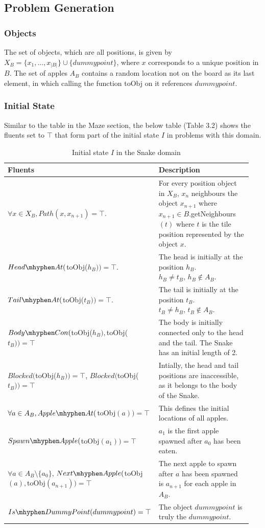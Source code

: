 \subsection{Problem Generation}
\subsubsection{Objects}
The set of objects, which are all positions, is given by $X_B = \{x_1, ..., x_{|B|}\} \cup \{dummypoint\}$, where $x$ corresponds to a unique position in $B$. The set of apples $A_B$ contains a random location not on the board as its last element, in which calling the function toObj on it references $dummypoint$.

\subsubsection{Initial State}
Similar to the table in the Maze section, the below table (Table 3.2) shows the fluents set to $\top$ that form part of the initial state $I$ in problems with this domain.

\begin{table}[ht]
\centering
\begin{tabular}{|p{0.473\linewidth}|p{0.473\linewidth}|}
\hline
Fluents & Description \\\hline
$\forall x \in X_B, Path(x, x_{n + 1}) = \top$. & For every position object in $X_B$, $x_{n}$ neighbours the object $x_{n+1}$ where $x_{n+1} \in B.$getNeighbours$(t)$ where $t$ is the tile position represented by the object $x$. \\\hline
$Head\mhyphen At($toObj($h_B)) = \top$. & The head is initially at the position $h_B$. $h_B \neq t_B,\, h_B \notin A_B$. \\\hline
$Tail\mhyphen At($toObj($t_B)) = \top$. & The tail is initially at the position $t_B$. $t_B \neq h_B,\, t_B \notin A_B$. \\\hline
$Body\mhyphen Con($toObj($h_B), $toObj($t_B)) = \top$ & The body is initially connected only to the head and the tail. The Snake has an initial length of 2. \\\hline
$Blocked($toObj($h_B)) = \top$\hfill, $Blocked($toObj($t_B)) = \top$ & Intially, the head and tail positions are inaccessible, as it belongs to the body of the Snake.\\\hline
$\forall a \in A_B, Apple\mhyphen At($toObj$(a)) = \top$& This defines the initial locations of all apples. \\\hline
$Spawn\mhyphen Apple($toObj$(a_1)) = \top$& $a_1$ is the first apple spawned after $a_0$ has been eaten. \\\hline
$\forall a \in A_B \setminus \{a_0\}$\hfill, $Next\mhyphen Apple($toObj$(a), $toObj$(a_{n+1})) = \top$& The next apple to spawn after $a$ has been spawned is $a_{n+1}$ for each apple in $A_B$.  \\\hline
$Is\mhyphen DummyPoint(dummypoint) = \top$& The object $dummypoint$ is truly the $dummypoint$.  \\\hline
\end{tabular}
\caption{Initial state $I$ in the Snake domain}
\end{table}

